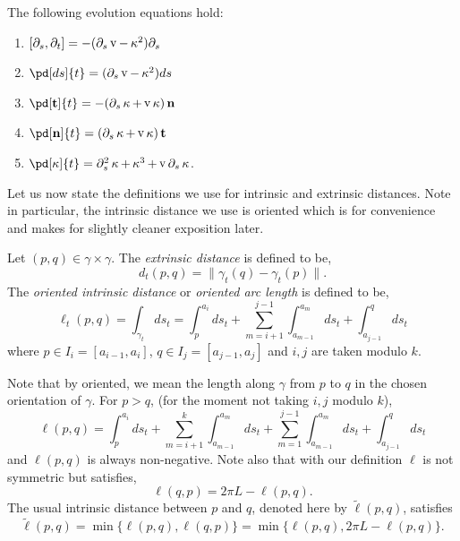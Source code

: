\documentclass[11pt]{amsart}
\DeclareMathOperator{\tangspeed}{v}
\begin{document}
\begin{lemma}
\label{lem:basic_evolution}
The following evolution equations hold:
\begin{enumerate}
\item \([\partial_s, \partial_t] = -(\partial_s \tangspeed - \curvecurv^2) \partial_s\)
\item \(\pd[ds]{t} = (\partial_s \tangspeed - \curvecurv^2) ds\)
\item \(\pd[\tang]{t} = -(\partial_s \curvecurv + \tangspeed\curvecurv) \nor\)
\item \(\pd[\nor]{t} = (\partial_s \curvecurv + \tangspeed\curvecurv) \tang\)
\item \(\pd[\curvecurv]{t} = \partial_s^2 \curvecurv + \curvecurv^3 + \tangspeed \partial_s \curvecurv\).
\end{enumerate}
\end{lemma}

Let us now state the definitions we use for intrinsic and extrinsic distances. Note in particular, the intrinsic distance we use is oriented which is for convenience and makes for slightly cleaner exposition later.

\begin{defn}
\label{defn:dist}
Let \((p,q) \in \gamma \times \gamma\). The \emph{extrinsic distance} is defined to be,
\[
d_t(p, q) = \|\gamma_t(q) - \gamma_t(p)\|.
\]
The \emph{oriented intrinsic distance} or \emph{oriented arc length} is defined to be,
\[
\ell_t(p, q) = \int_{\gamma_t} ds_t = \int_p^{a_i} ds_t + \sum_{m=i+1}^{j-1} \int_{a_{m-1}}^{a_m} ds_t + \int_{a_{j-1}}^q ds_t
\]
where \(p \in I_i = [a_{i-1}, a_i]\), \(q \in I_j = [a_{j-1}, a_j]\) and \(i,j\) are taken modulo \(k\).
\end{defn}

Note that by oriented, we mean the length along \(\gamma\) from \(p\) to \(q\) in the chosen orientation of \(\gamma\). For \(p > q\), (for the moment not taking \(i,j\) modulo \(k\)),
\[
\ell(p, q) = \int_p^{a_i} ds_t + \sum_{m=i+1}^{k} \int_{a_{m-1}}^{a_m} ds_t + \sum_{m=1}^{j-1} \int_{a_{m-1}}^{a_m} ds_t + \int_{a_{j-1}}^q ds_t
\]
and \(\ell(p, q)\) is always non-negative. Note also that with our definition \(\ell\) is not symmetric but satisfies,
\begin{equation}
\label{eq:ell_symmetry}
\ell(q, p) = 2\pi L - \ell(p, q).
\end{equation}
The usual intrinsic distance between \(p\) and \(q\), denoted here by \(\tilde{\ell}(p, q)\), satisfies
\[
\tilde{\ell}(p, q) = \min\{\ell(p, q), \ell(q, p)\} = \min\{\ell(p, q), 2\pi L - \ell(p, q)\}.
\]
\end{document}
